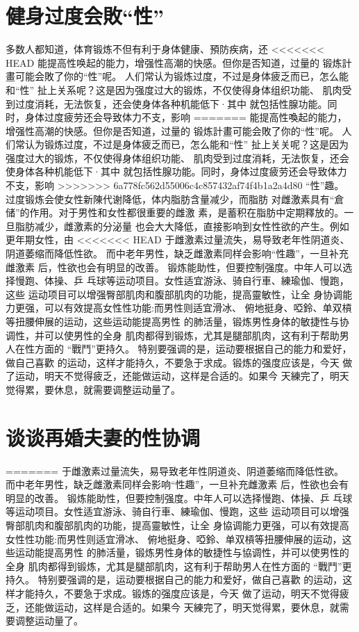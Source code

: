\documentclass[12pt,UTF8]{ctexbook}
\begin{document}
\section{健身过度会敗“性”}

多数人都知道，体育锻炼不但有利于身体健康、預防疾病，还
<<<<<<< HEAD
能提高性唤起的能力，增强性高潮的快感。但你是否知道，过量的
锻炼計畫可能会敗了你的“性”呢。
人们常认为锻炼过度，不过是身体疲乏而已，怎么能和“性”
扯上关系呢？这是因为强度过大的锻炼，不仅使得身体组织功能、
肌肉受到过度消耗，无法恢复，还会使身体各种机能低下·其中
就包括性腺功能。同时，身体过度疲劳还会导致体力不支，影响
=======
能提高性喚起的能力，增强性高潮的快感。但你是否知道，过量的
锻炼計畫可能会敗了你的“性”呢。
人们常认为锻炼过度，不过是身体疲乏而已，怎么能和“性”
扯上关关呢？这是因为强度过大的锻炼，不仅使得身体组织功能、
肌肉受到过度消耗，无法恢复，还会使身体各种机能低下·其中
就包括性腺功能。同时，身体过度疲劳还会导致体力不支，影响
>>>>>>> 6a778fc562d55006c4c857432af74f4b1a2a4d80
“性”趣。
过度锻炼会使女性新陳代谢降低，体内脂肪含量减少，而脂肪
对雌激素具有“倉储”的作用。对于男性和女性都很重要的雌激
素，是蓄积在脂肪中定期釋放的。一旦脂肪减少，雌激素的分泌量
也会大大降低，直接影响到女性性欲的产生。例如更年期女性，由
<<<<<<< HEAD
于雌激素过量流失，易导致老年性阴道炎、阴道萎缩而降低性欲。
而中老年男性，缺乏雌激素同样会影响“性趣”，一旦补充雌激素
后，性欲也会有明显的改善。
锻炼能助性，但要控制强度。中年人可以选择慢跑、体操、乒
乓球等运动项目。女性适宜游泳、骑自行車、練瑜伽、慢跑，这些
运动项目可以增强臀部肌肉和腹部肌肉的功能，提高靈敏性，让全
身协调能力更强，可以有效提高女性性功能:而男性则适宜滑冰、
俯地挺身、啞鈴、单双槓等扭腰伸展的运动，这些运动能提高男性
的肺活量，锻炼男性身体的敏捷性与协调性，并可以使男性的全身
肌肉都得到锻炼，尤其是腿部肌肉，这有利于帮助男人在性方面的
“戰鬥”更持久。
特别要强调的是，运动要根据自己的能力和爱好，做自己喜歡
的运动，这样才能持久，不要急于求成。锻炼的强度应该是，今天
做了运动，明天不觉得疲乏，还能做运动，这样是合适的。如果今
天練完了，明天觉得累，要休息，就需要调整运动量了。

\section{谈谈再婚夫妻的性协调}
=======
于雌激素过量流失，易导致老年性阴道炎、阴道萎缩而降低性欲。
而中老年男性，缺乏雌激素同样会影响“性趣”，一旦补充雌激素
后，性欲也会有明显的改善。
锻炼能助性，但要控制强度。中年人可以选择慢跑、体操、乒
乓球等运动项目。女性适宜游泳、骑自行車、練瑜伽、慢跑，这些
运动项目可以增强臀部肌肉和腹部肌肉的功能，提高靈敏性，让全
身協调能力更强，可以有效提高女性性功能:而男性则适宜滑冰、
俯地挺身、啞鈴、单双槓等扭腰伸展的运动，这些运动能提高男性
的肺活量，锻炼男性身体的敏捷性与協调性，并可以使男性的全身
肌肉都得到锻炼，尤其是腿部肌肉，这有利于帮助男人在性方面的
“戰鬥”更持久。
特别要强调的是，运动要根据自己的能力和爱好，做自己喜歡
的运动，这样才能持久，不要急于求成。锻炼的强度应该是，今天
做了运动，明天不觉得疲乏，还能做运动，这样是合适的。如果今
天練完了，明天觉得累，要休息，就需要调整运动量了。
\end{document}
